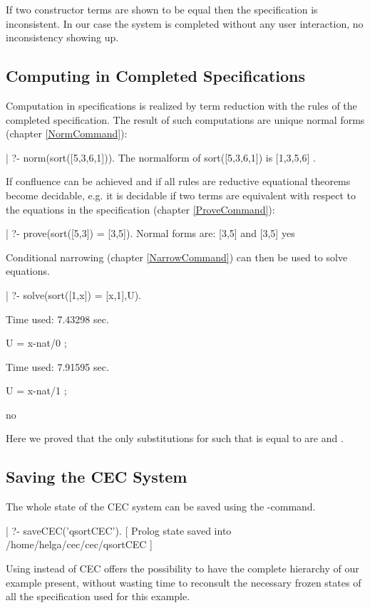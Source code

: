 If two constructor terms are shown to be equal then the specification
is inconsistent. In our case the system is completed without any user 
interaction, no inconsistency showing up.

\subsection{Computing in Completed Specifications}

Computation in specifications is realized by term reduction with the
rules of the completed specification. The result of such computations are unique
normal forms ( chapter \ref{NormCommand}):

\begin{screen}
| ?- norm(sort([5,3,6,1])).
The normalform of sort([5,3,6,1]) is [1,3,5,6] .
\end{screen}

\noindent
If confluence can be achieved and if all rules are reductive equational theorems 
become decidable, e.g. it is decidable if two terms are equivalent with respect to the
equations in the specification ( chapter \ref{ProveCommand}):

\begin{screen}
| ?- prove(sort([5,3]) = [3,5]).
Normal forms are: [3,5] and [3,5]
yes
\end{screen}

\noindent 
Conditional narrowing ( chapter \ref{NarrowCommand}) can then be used to solve 
equations.

\begin{screen}
| ?- solve(sort([1,x]) = [x,1],U).

Time used: 7.43298 sec.

U = {x-nat/0} ;

Time used: 7.91595 sec.

U = {x-nat/1} ;

no
\end{screen}

\noindent
Here we proved that the only substitutions for  such that
 is equal to \cec{[x,1]} are  and .

\subsection{Saving the CEC System}

The whole state of the CEC system can be saved using the
-command. 

\begin{screen}
| ?- saveCEC('qsortCEC').
[ Prolog state saved into /home/helga/cec/cec/qsortCEC ]
\end{screen}

Using  instead of CEC offers the possibility to have
the complete hierarchy of our  example present, without
wasting time to reconsult the necessary frozen states of all the
specification used for this example.

